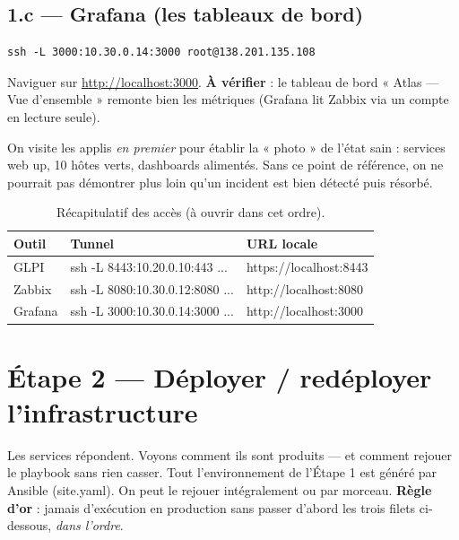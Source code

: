 \documentclass[11pt,a4paper]{article}
\newcommand{\cmd}[1]{{\ttfamily #1}}
\begin{document}
\subsection{1.c — Grafana (les tableaux de bord)}
\begin{lstlisting}[style=bash]
ssh -L 3000:10.30.0.14:3000 root@138.201.135.108
\end{lstlisting}
Naviguer sur \url{http://localhost:3000}. \textbf{À vérifier} : le tableau de bord
« Atlas — Vue d'ensemble » remonte bien les métriques (Grafana lit Zabbix via un compte
en lecture seule).

\begin{pourquoi}
On visite les applis \emph{en premier} pour établir la « photo » de l'état sain :
services web up, 10 hôtes verts, dashboards alimentés. Sans ce point de référence, on ne
pourrait pas démontrer plus loin qu'un incident est bien détecté puis résorbé.
\end{pourquoi}

\begin{table}[h]
\centering\small
\begin{tabularx}{\linewidth}{@{}l l X@{}}
\toprule
\textbf{Outil} & \textbf{Tunnel} & \textbf{URL locale} \\
\midrule
GLPI    & \cmd{ssh -L 8443:10.20.0.10:443 ...} & \cmd{https://localhost:8443} \\
Zabbix  & \cmd{ssh -L 8080:10.30.0.12:8080 ...} & \cmd{http://localhost:8080} \\
Grafana & \cmd{ssh -L 3000:10.30.0.14:3000 ...} & \cmd{http://localhost:3000} \\
\bottomrule
\end{tabularx}
\caption{Récapitulatif des accès (à ouvrir dans cet ordre).}
\end{table}

\section{Étape 2 — Déployer / redéployer l'infrastructure}
\begin{etape}{Les services répondent. Voyons comment ils sont produits — et comment
rejouer le playbook sans rien casser.}
Tout l'environnement de l'Étape 1 est généré par Ansible (\cmd{site.yaml}). On peut le
rejouer intégralement ou par morceau. \textbf{Règle d'or} : jamais d'exécution en
production sans passer d'abord les trois filets ci-dessous, \emph{dans l'ordre}.
\end{etape}
\end{document}

